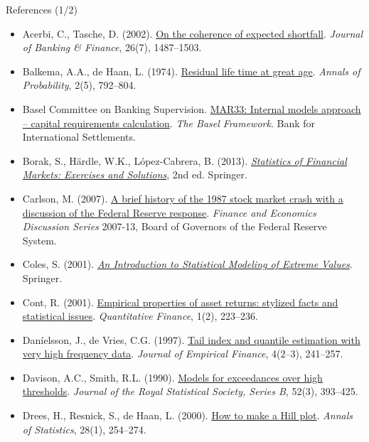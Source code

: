 \begin{frame}{References (1/2)}
\itemsize{\tiny}
\begin{itemize}
    \item Acerbi, C., Tasche, D. (2002). \href{https://doi.org/10.1016/S0378-4266(02)00283-2}{On the coherence of expected shortfall}. \textit{Journal of Banking \& Finance}, 26(7), 1487--1503.
    \item Balkema, A.A., de Haan, L. (1974). \href{https://doi.org/10.1214/aop/1176996548}{Residual life time at great age}. \textit{Annals of Probability}, 2(5), 792--804.
    \item Basel Committee on Banking Supervision. \href{https://www.bis.org/basel_framework/chapter/MAR/33.htm}{MAR33: Internal models approach -- capital requirements calculation}. \textit{The Basel Framework}. Bank for International Settlements.
    \item Borak, S., Härdle, W.K., López-Cabrera, B. (2013). \href{https://doi.org/10.1007/978-3-642-33929-5}{\textit{Statistics of Financial Markets: Exercises and Solutions}}, 2nd ed. Springer.
    \item Carlson, M. (2007). \href{https://www.federalreserve.gov/pubs/feds/2007/200713/200713pap.pdf}{A brief history of the 1987 stock market crash with a discussion of the Federal Reserve response}. \textit{Finance and Economics Discussion Series} 2007-13, Board of Governors of the Federal Reserve System.
    \item Coles, S. (2001). \href{https://doi.org/10.1007/978-1-4471-3675-0}{\textit{An Introduction to Statistical Modeling of Extreme Values}}. Springer.
    \item Cont, R. (2001). \href{https://doi.org/10.1080/713665670}{Empirical properties of asset returns: stylized facts and statistical issues}. \textit{Quantitative Finance}, 1(2), 223--236.
    \item Daníelsson, J., de Vries, C.G. (1997). \href{https://doi.org/10.1016/S0927-5398(97)00008-X}{Tail index and quantile estimation with very high frequency data}. \textit{Journal of Empirical Finance}, 4(2--3), 241--257.
    \item Davison, A.C., Smith, R.L. (1990). \href{https://doi.org/10.1111/j.2517-6161.1990.tb01796.x}{Models for exceedances over high thresholds}. \textit{Journal of the Royal Statistical Society, Series B}, 52(3), 393--425.
    \item Drees, H., Resnick, S., de Haan, L. (2000). \href{https://doi.org/10.1214/aos/1016120372}{How to make a Hill plot}. \textit{Annals of Statistics}, 28(1), 254--274.

\end{itemize}
\end{frame}
